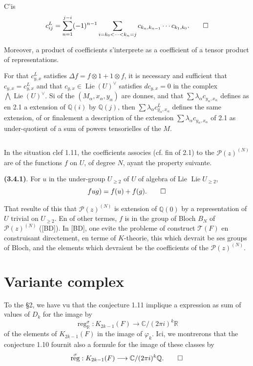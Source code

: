 \documentclass[12pt,a4paper]{article}
\theoremstyle{plain}
\theoremstyle{definition}
\theoremstyle{remark}
\DeclareMathOperator{\reg}{reg}
\DeclareMathOperator{\Lie}{Lie}
\newcommand{\Q}{\mathbb{Q}}
\newcommand{\R}{\mathbb{R}}
\newcommand{\C}{\mathbb{C}}
\begin{document}
{{C'is
\begin{equation*}
c_{ij}^L = \sum_{n=1}^{j-i}(-1)^{n-1}\sum_{i=k_0<\cdots<k_n=j}c_{k_n,k_{n-1}}\cdots c_{k_1,k_0}.\qedhere
\end{equation*}

Moreover, a product of coefficients s'interprete as a coefficient of a tensor product of representations.

For that $c_{y,x}^L$ satisfies $\Delta f=f\otimes 1+1\otimes f$, it is necessary and sufficient that $c_{y,x}=c_{y,x}^L$ and that $c_{y,x}\in\Lie(U)^\vee$ satisfies $dc_{y,x}=0$ in the complex $\bigwedge\Lie(U)^\vee$. Si of the $(M_\alpha,x_\alpha,y_\alpha)$ are donnes, and that $\sum\lambda_\alpha c_{y_\alpha,x_\alpha}$ defines as en 2.1 a extension of $\Q(i)$ by $\Q(j)$, then $\sum\lambda_\alpha c_{y_\alpha,x_\alpha}^L$ defines the same extension, of or finalement a description of the extension $\sum\lambda_\alpha c_{y_\alpha,x_\alpha}$ of 2.1 as under-quotient of a sum of powers tensorielles of the $M$.

\subsection{}

In the situation clef 1.11, the coefficients associes (cf. fin of 2.1) to the $\mathcal{P}(z)^{(N)}$ are of the functions $f$ on $U$, of degree $N$, ayant the property suivante.

\textbf{(3.4.1)}. For $u$ in the under-group $U_{\geq 2}$ of $U$ of algebra of Lie $\Lie U_{\geq 2}$,
\begin{equation*}
 fug) = f(u)+f(g).\qedhere
\end{equation*}

That resulte of this that $\mathcal{P}(z)^{(N)}$ is extension of $\Q(0)$ by a representation of $U$ trivial on $U_{\geq 2}$. En of other termes, $f$ is in the group of Bloch $B_N$ of $\mathcal{P}(z)^{(N)}$ ([BD]). In [BD], one evite the probleme of construct $\mathcal{T}(F)$ en construisant directement, en terme of $K$-theorie, this which devrait be ses groups of Bloch, and the elements which devraient be the coefficients of the $\mathcal{P}(z)^{(N)}$.


\section{Variante complex}

To the \S 2, we have vu that the conjecture 1.11 implique a expression as sum of values of $D_k$ for the image by
\begin{equation*}
\reg_\R^\sigma : K_{2k-1}(F) \longrightarrow \C/(2\pi i)^k\R
\end{equation*}
of the elements of $K_{2k-1}(F)$ in the image of $\varphi_k$. Ici, we montrerons that the conjecture 1.10 fournit also a formule for the image of these classes by
\begin{equation*}
\reg^\sigma : K_{2k-1}(F) \longrightarrow \C/(2\pi i)^k\Q.\qedhere
\end{equation*}

}}
\end{document}

